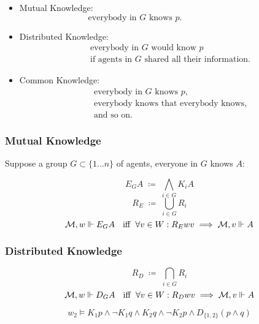 \documentclass[UTF8,11pt,colorlinks,compress,openany]{beamer}%
\begin{document}
\begin{frame}\frametitle{}
\begin{itemize}
	\item Mutual Knowledge:
	\[\text{everybody in $G$ knows $p$.}\phantom{everyone knows it}\]
	\item Distributed Knowledge:
	\[\begin{aligned}
		&\text{everybody in $G$ would know $p$}\\
		&\text{if agents in $G$ shared all their information.}
	\end{aligned}\]
	\item Common Knowledge:
	\[\begin{aligned}
		&\text{everybody in $G$ knows $p$,}\\
		&\text{everybody knows that everybody knows,}\\
		&\text{and so on.}
	\end{aligned}\]
\end{itemize}
\end{frame}

\begin{frame}\frametitle{Mutual Knowledge}
	Suppose a group $G\subset\{1\dots n\}$ of agents, everyone in $G$ knows $A$:
		
		\[E_G A \;\coloneqq \;\bigwedge\limits_{i\in G}K_i A\]
		\[R_E\;\coloneqq \;\bigcup\limits_{i\in G}R_i\]
		\[\mathcal{M},w\Vdash E_G A\ \mbox{\; iff \;} \forall v\in W: R_Ewv\implies\mathcal{M},v\Vdash A\]
\end{frame}

\begin{frame}\frametitle{Distributed Knowledge}
		\[R_D\;\coloneqq \;\bigcap\limits_{i\in G}R_i\]
		\[\mathcal{M},w\Vdash D_G A\ \mbox{\; iff \;} \forall v\in W: R_Dwv\implies\mathcal{M},v\Vdash A\]
\begin{center}
\end{center}
\[w_2\vDash K_1 p\wedge\neg K_1 q\wedge K_2 q\wedge\neg K_2 p\wedge D_{\{1,2\}}(p\wedge q)\]
\end{frame}
\end{document}
